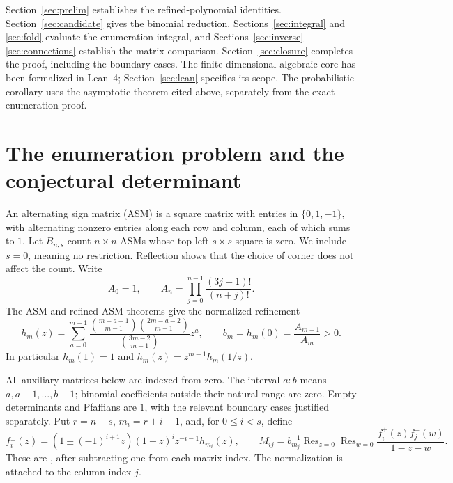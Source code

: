 \documentclass[11pt,a4paper]{amsart}
\theoremstyle{remark}\newtheorem{remark}[theorem]{Remark}
\numberwithin{equation}{section}
\DeclareMathOperator{\Res}{Res}
\begin{document}
Section~\ref{sec:prelim} establishes the refined-polynomial identities. Section~\ref{sec:candidate} gives the binomial reduction. Sections~\ref{sec:integral} and \ref{sec:fold} evaluate the enumeration integral, and Sections~\ref{sec:inverse}--\ref{sec:connections} establish the matrix comparison. Section~\ref{sec:closure} completes the proof, including the boundary cases. The finite-dimensional algebraic core has been formalized in Lean~4; Section~\ref{sec:lean} specifies its scope. The probabilistic corollary uses the asymptotic theorem cited above, separately from the exact enumeration proof.

\section{The enumeration problem and the conjectural determinant}
An alternating sign matrix (ASM) is a square matrix with entries in $\{0,1,-1\}$, with alternating nonzero entries along each row and column, each of which sums to $1$. Let $B_{n,s}$ count $n\times n$ ASMs whose top-left $s\times s$ square is zero. We include $s=0$, meaning no restriction. Reflection shows that the choice of corner does not affect the count. Write
\begin{equation}\label{eq:asm}
 A_0=1,\qquad A_n=\prod_{j=0}^{n-1}\frac{(3j+1)!}{(n+j)!}.
\end{equation}
The ASM and refined ASM theorems \cite{Z,Ku,Zref} give the normalized refinement
\begin{equation}\label{eq:h}
 h_m(z)=\sum_{a=0}^{m-1}
 \frac{\binom{m+a-1}{m-1}\binom{2m-a-2}{m-1}}
 {\binom{3m-2}{m-1}}z^a,\qquad
 b_m=h_m(0)=\frac{A_{m-1}}{A_m}>0.
\end{equation}
In particular $h_m(1)=1$ and $h_m(z)=z^{m-1}h_m(1/z)$.

All auxiliary matrices below are indexed from zero. The interval $a:b$ means $a,a+1,\ldots,b-1$; binomial coefficients outside their natural range are zero. Empty determinants and Pfaffians are $1$, with the relevant boundary cases justified separately.
Put $r=n-s$, $m_i=r+i+1$, and, for $0\le i<s$, define
\begin{equation}\label{eq:cpM}
 f_i^\pm(z)=(1\pm(-1)^{i+1}z)(1-z)^iz^{-i-1}h_{m_i}(z),\qquad
 M_{ij}=b_{m_j}^{-1}\Res_{z=0}\Res_{w=0}
 \frac{f_i^+(z)f_j^-(w)}{1-z-w}.
\end{equation}
These are \cite[(1.7)--(1.9)]{CP}, after subtracting one from each matrix index. The normalization is attached to the column index $j$.
\end{document}
